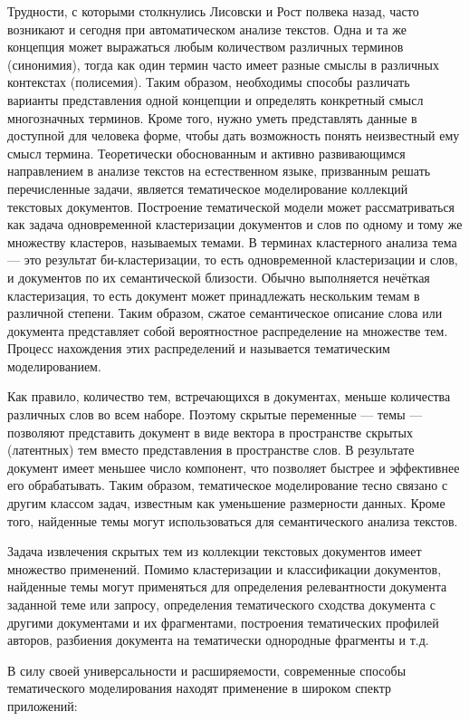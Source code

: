 Трудности, с которыми столкнулись Лисовски и Рост полвека назад, часто возникают и сегодня при автоматическом анализе текстов. Одна и та же концепция может выражаться любым количеством различных терминов (синонимия), тогда как один термин часто имеет разные смыслы в различных контекстах (полисемия). Таким образом, необходимы способы различать варианты представления одной концепции и определять конкретный смысл многозначных терминов. Кроме того, нужно уметь представлять данные в доступной для человека форме, чтобы дать возможность понять неизвестный ему смысл термина. Теоретически обоснованным и активно развивающимся направлением в анализе текстов на естественном языке, призванным решать перечисленные задачи, является тематическое моделирование коллекций текстовых документов.   Построение тематической модели может рассматриваться как задача одновременной кластеризации документов и слов по одному и тому же множеству кластеров, называемых темами. В терминах кластерного анализа тема — это результат би-кластеризации, то есть одновременной кластеризации и слов, и документов по их семантической близости. Обычно выполняется нечёткая кластеризация, то есть документ может принадлежать нескольким темам в различной степени. Таким образом, сжатое семантическое описание слова или документа представляет собой вероятностное распределение на множестве тем. Процесс нахождения этих распределений и называется тематическим моделированием. 

Как правило, количество тем, встречающихся в документах, меньше количества различных слов во всем наборе. Поэтому скрытые переменные — темы — позволяют представить документ в виде вектора в пространстве скрытых (латентных) тем вместо представления в пространстве слов. В результате документ имеет меньшее число компонент, что позволяет быстрее и эффективнее его обрабатывать. Таким образом, тематическое моделирование тесно связано с другим классом задач, известным как уменьшение размерности данных. Кроме того, найденные темы могут использоваться для семантического анализа текстов. 

Задача извлечения скрытых тем из коллекции текстовых документов имеет множество применений. Помимо кластеризации и классификации документов, найденные темы могут применяться для определения релевантности документа заданной теме или запросу, определения тематического сходства документа с другими документами и их фрагментами, построения тематических профилей авторов, разбиения документа на тематически однородные фрагменты и т.д. 

В силу своей универсальности и расширяемости, современные способы тематического моделирования находят применение в широком спектр приложений: 

